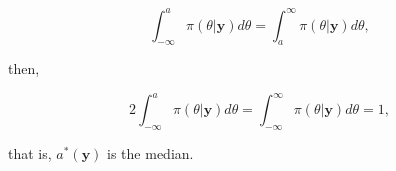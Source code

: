 \begin{enumerate}[leftmargin=*]
\begin{equation}
	\int_{-\infty}^a \pi({\theta}|\mathbf{y})d{\theta}=\int_{a}^{\infty} \pi({\theta}|\mathbf{y})d{\theta},  
\end{equation}

then,

\begin{equation}
	2\int_{-\infty}^a \pi({\theta}|\mathbf{y})d{\theta}=\int_{-\infty}^{\infty} \pi({\theta}|\mathbf{y})d{\theta}=1,  
\end{equation}

that is, $a^*(\mathbf{y})$ is the median.
\end{enumerate}